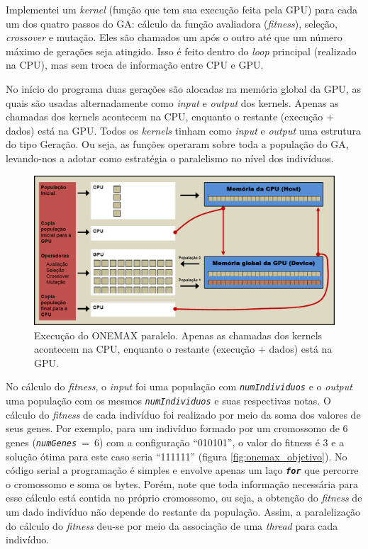 	Implementei um \emph{kernel} (função que tem sua execução feita pela GPU) para cada um dos quatro passos do GA: cálculo da função avaliadora (\emph{fitness}), seleção, \emph{crossover} e mutação. Eles são chamados um após o outro até que um número máximo de gerações seja atingido. Isso é feito dentro do \emph{loop} principal (realizado na CPU), mas sem troca de informação entre CPU e GPU.
	
	No início do programa duas gerações são alocadas na memória global da GPU, as quais são usadas alternadamente como \emph{input} e \emph{output} dos kernels. Apenas as chamadas dos kernels acontecem na CPU, enquanto o restante (execução + dados) está na GPU. Todos os \emph{kernels} tinham como \emph{input} e \emph{output} uma estrutura do tipo Geração. Ou seja, as funções operaram sobre toda a população do GA, levando-nos a adotar como estratégia o paralelismo no nível dos indivíduos.
	
	\begin{figure}[htbp]
		\centering
			\includegraphics[width=1.00\textwidth]{figs/resultados/onemax/onemax_execucao.png}
		\caption{Execução do ONEMAX paralelo. Apenas as chamadas dos kernels acontecem na CPU, enquanto o restante (execução + dados) está na GPU.}
		\label{fig:onemax_execucao}
	\end{figure}
		
	No cálculo do \emph{fitness}, o \emph{input} foi uma população com \textit{\texttt{numIndividuos}} e o \emph{output} uma população com os mesmos \textit{\texttt{numIndividuos}} e suas respectivas notas. O cálculo do \emph{fitness} de cada indivíduo foi realizado por meio da soma dos valores de seus genes. Por exemplo, para um indivíduo formado por um cromossomo de 6 genes \mbox{(\textit{\texttt{numGenes}} = 6)} com a configuração “010101”, o valor do fitness é 3 e a solução ótima para este caso seria “111111” (figura \ref{fig:onemax_objetivo}). No código serial a programação é simples e envolve apenas um laço \texttt{\textbf{\textit{for}}} que percorre o cromossomo e soma os bytes. Porém, note que toda informação necessária para esse cálculo está contida no próprio cromossomo, ou seja, a obtenção do \emph{fitness} de um dado indivíduo não depende do restante da população. Assim, a paralelização do cálculo do \emph{fitness} deu-se por meio da associação de uma \emph{thread} para cada indivíduo.
	
